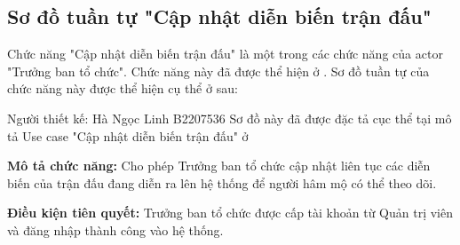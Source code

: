 \subsection{Sơ đồ tuần tự "Cập nhật diễn biến trận đấu"}
\setcounter{figure}{0}

Chức năng "Cập nhật diễn biến trận đấu" là một trong các chức năng của actor "Trưởng ban tổ chức". Chức năng này đã được thể hiện ở \myref{}. Sơ đồ tuần tự của chức năng này được thể hiện cụ thể ở \myref{} sau:

Người thiết kế: Hà Ngọc Linh B2207536
Sơ đồ này đã được đặc tả cục thể tại mô tả Use case "Cập nhật diễn biến trận đấu" ở \myreftb{}

\noindent
\textbf{Mô tả chức năng:} Cho phép Trưởng ban tổ chức cập nhật liên tục các diễn biến của trận đấu đang diễn ra lên hệ thống để người hâm mộ có thể theo dõi.

\noindent
\textbf{Điều kiện tiên quyết:} Trưởng ban tổ chức được cấp tài khoản từ Quản trị viên và đăng nhập thành công vào hệ thống.

